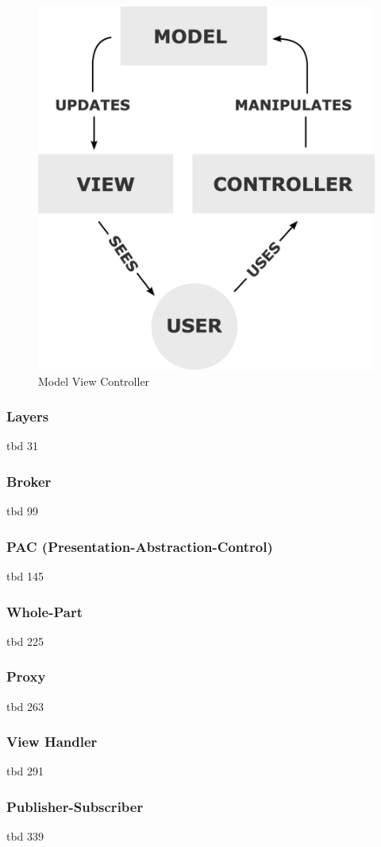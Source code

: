 \begin{figure}[h!]
    \centering
    \caption{Model View Controller}
    \label{fig:mvc}
    \includegraphics[scale=0.20]{assets/wikipedia_mvc_process}
\end{figure}

\color{red}

\subsubsection{Layers}
tbd 31

\subsubsection{Broker}
tbd 99

\subsubsection{PAC (Presentation-Abstraction-Control)}
tbd 145

\subsubsection{Whole-Part}
tbd 225

\subsubsection{Proxy}
tbd 263

\subsubsection{View Handler}
tbd 291

\subsubsection{Publisher-Subscriber}
tbd 339

\color{black}
